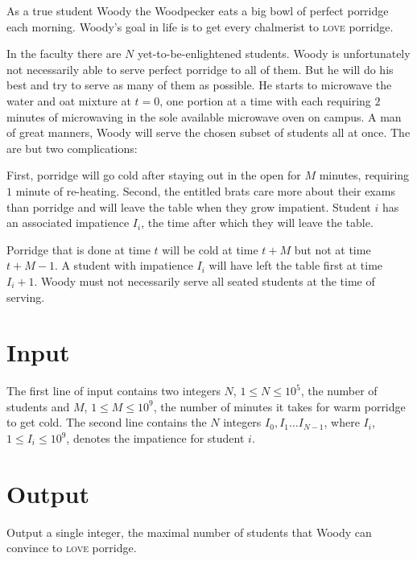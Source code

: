 As a true student Woody the Woodpecker eats a big bowl of perfect porridge each morning. Woody’s goal in life is to get every chalmerist to \textsc{love} porridge.

In the faculty there are $N$ yet-to-be-enlightened students. Woody is unfortunately not necessarily able to serve perfect porridge to all of them. But he will do his best and try to serve as many of them as possible. He starts to microwave the water and oat mixture at $t=0$, one portion at a time with each requiring $2$ minutes of microwaving in the sole available microwave oven on campus. A man of great manners, Woody will serve the chosen subset of students all at once. The are but two complications:

First, porridge will go cold after staying out in the open for $M$ minutes, requiring $1$ minute of re-heating. Second, the entitled brats care more about their exams than porridge and will leave the table when they grow impatient. Student $i$ has an associated impatience $I_i$, the time after which they will leave the table.

Porridge that is done at time $t$ will be cold at time $t+M$ but not at time $t+M-1$. A student with impatience $I_i$ will have left the table first at time $I_i+1$. Woody must not necessarily serve all seated students at the time of serving.

\section*{Input}
The first line of input contains two integers $N$, $1 \leq N \leq 10^5$, the number of students and $M$, $1 \leq M \leq 10^9$, the number of minutes it takes for warm porridge to get cold. The second line contains the $N$ integers $I_0, I_1 \ldots I_{N-1}$, where $I_i$, $1 \leq I_i \leq 10^9$, denotes the impatience for student $i$.


\section*{Output}
Output a single integer, the maximal number of students that Woody can convince to \textsc{love} porridge.
